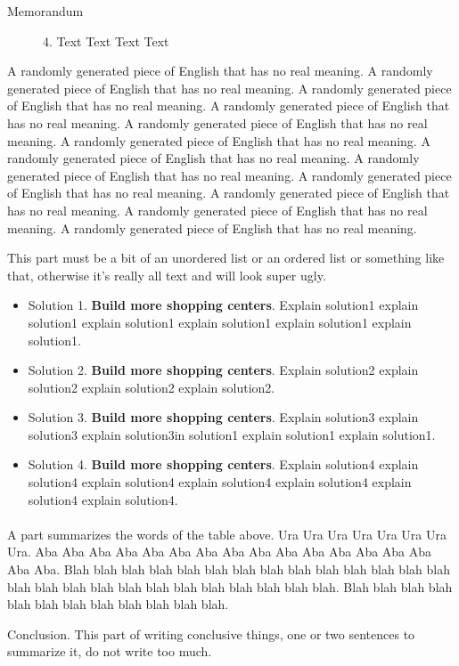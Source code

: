 \documentclass[12pt]{ctexart}
\newcommand{\upcite}[1]{\textsuperscript{\textsuperscript{\cite{#1}}}}%
\begin{document}
\begin{letter}{ \centering Memorandum }
\begin{figure}
\begin{tcolorbox}
		4. Text Text Text Text 
		\vspace{0.3cm}
	\end{tcolorbox}
	\end{figure}
	A randomly generated piece of English that has no real meaning. A randomly generated piece of English that has no real meaning. A randomly generated piece of English that has no real meaning. A randomly generated piece of English that has no real meaning. A randomly generated piece of English that has no real meaning. A randomly generated piece of English that has no real meaning. A randomly generated piece of English that has no real meaning. A randomly generated piece of English that has no real meaning. A randomly generated piece of English that has no real meaning. A randomly generated piece of English that has no real meaning. A randomly generated piece of English that has no real meaning. A randomly generated piece of English that has no real meaning. 

	This part must be a bit of an unordered list or an ordered list or something like that, otherwise it's really all text and will look super ugly.


	\begin{itemize}
	\item Solution 1. \textbf{Build more shopping centers}. Explain solution1 explain solution1 explain solution1 explain solution1 explain solution1 explain solution1.
	\item Solution 2. \textbf{Build more shopping centers}. Explain solution2 explain solution2 explain solution2 explain solution2.
	\item Solution 3. \textbf{Build more shopping centers}. Explain solution3 explain solution3 explain solution3in solution1 explain solution1 explain solution1.
	\item Solution 4. \textbf{Build more shopping centers}. Explain solution4 explain solution4 explain solution4 explain solution4 explain solution4 explain solution4 explain solution4.
	\end{itemize}

	\vspace{-0.2cm}

	A part summarizes\upcite{1,2} the words of the table above. Ura Ura Ura Ura Ura Ura Ura Ura. Aba Aba Aba Aba Aba Aba Aba Aba Aba Aba Aba Aba Aba Aba Aba Aba Aba. Blah blah blah blah blah blah blah blah blah blah blah blah blah blah blah blah blah blah blah blah blah blah blah blah blah blah. Blah blah blah blah blah blah blah blah blah blah blah blah.


	Conclusion. This part of writing conclusive things, one or two sentences to summarize it, do not write too much.
\end{letter}
\end{document}
